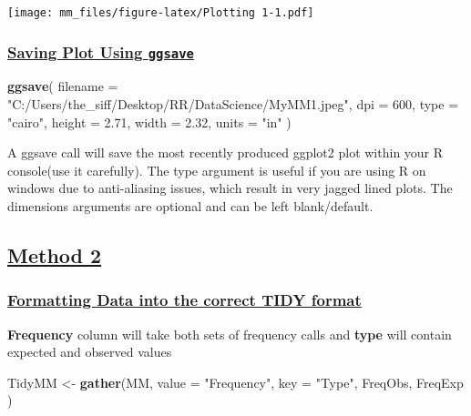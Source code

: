 \documentclass[]{article}
\newenvironment{Shaded}{\begin{snugshade}}{\end{snugshade}}
\newcommand{\KeywordTok}[1]{\textcolor[rgb]{0.13,0.29,0.53}{\textbf{#1}}}
\newcommand{\DataTypeTok}[1]{\textcolor[rgb]{0.13,0.29,0.53}{#1}}
\newcommand{\DecValTok}[1]{\textcolor[rgb]{0.00,0.00,0.81}{#1}}
\newcommand{\FloatTok}[1]{\textcolor[rgb]{0.00,0.00,0.81}{#1}}
\newcommand{\StringTok}[1]{\textcolor[rgb]{0.31,0.60,0.02}{#1}}
\newcommand{\NormalTok}[1]{#1}
\begin{document}
\texttt{[image: mm\_files/figure-latex/Plotting 1-1.pdf]}

\subsubsection{\texorpdfstring{\href{sheading-2}{Saving Plot Using
\texttt{ggsave}}}{Saving Plot Using ggsave}}\label{saving-plot-using-ggsave}

\begin{Shaded}
\begin{Highlighting}[]
\KeywordTok{ggsave}\NormalTok{(}
  \DataTypeTok{filename =} \StringTok{"C:/Users/the_siff/Desktop/RR/DataScience/MyMM1.jpeg"}\NormalTok{,}
  \DataTypeTok{dpi =} \DecValTok{600}\NormalTok{, }\DataTypeTok{type =} \StringTok{"cairo"}\NormalTok{,}
  \DataTypeTok{height =} \FloatTok{2.71}\NormalTok{,}
  \DataTypeTok{width  =} \FloatTok{2.32}\NormalTok{,}
  \DataTypeTok{units =} \StringTok{"in"}
\NormalTok{)}
\end{Highlighting}
\end{Shaded}

A ggsave call will save the most recently produced ggplot2 plot within
your R console(use it carefully). The type argument is useful if you are
using R on windows due to anti-aliasing issues, which result in very
jagged lined plots. The dimensions arguments are optional and can be
left blank/default.

\subsection{\texorpdfstring{\href{sheading-2}{Method
2}}{Method 2}}\label{method-2}

\subsubsection{\texorpdfstring{\href{sheading-2}{Formatting Data into
the correct TIDY
format}}{Formatting Data into the correct TIDY format}}\label{formatting-data-into-the-correct-tidy-format}

\textbf{Frequency} column will take both sets of frequency calls and
\textbf{type} will contain expected and observed values

\begin{Shaded}
\begin{Highlighting}[]
\NormalTok{TidyMM <-}\StringTok{ }\KeywordTok{gather}\NormalTok{(MM,}
  \DataTypeTok{value =} \StringTok{"Frequency"}\NormalTok{,}
  \DataTypeTok{key =} \StringTok{"Type"}\NormalTok{,}
\NormalTok{  FreqObs, FreqExp}
\NormalTok{)}
\end{Highlighting}
\end{Shaded}
\end{document}
